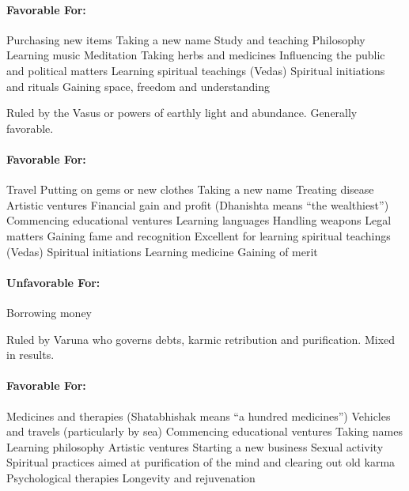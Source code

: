\paragraph{Favorable For:}

Purchasing new items
Taking a new name
Study and teaching
Philosophy
Learning music
Meditation
Taking herbs and medicines
Influencing the public and political matters
Learning spiritual teachings (Vedas)
Spiritual initiations and rituals
Gaining space, freedom and understanding
 


Ruled by the Vasus or powers of earthly light and abundance. Generally favorable.

 

\paragraph{Favorable For:}

Travel
Putting on gems or new clothes
Taking a new name
Treating disease
Artistic ventures
Financial gain and profit (Dhanishta means “the wealthiest”)
Commencing educational ventures
Learning languages
Handling weapons
Legal matters
Gaining fame and recognition
Excellent for learning spiritual teachings (Vedas)
Spiritual initiations
Learning medicine
Gaining of merit
 

\paragraph{Unfavorable For:}

Borrowing money
 


Ruled by Varuna who governs debts, karmic retribution and purification. Mixed in results.

 

\paragraph{Favorable For:}

Medicines and therapies (Shatabhishak means “a hundred medicines”)
Vehicles and travels (particularly by sea)
Commencing educational ventures
Taking names
Learning philosophy
Artistic ventures
Starting a new business
Sexual activity
Spiritual practices aimed at purification of the mind and clearing out old karma Psychological therapies
Longevity and rejuvenation
 

